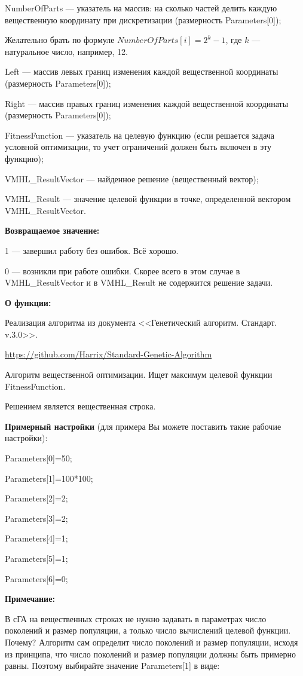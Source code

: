 \documentclass[a4paper,12pt]{article}
\begin{document}
 NumberOfParts --- указатель на массив: на сколько частей делить каждую вещественную координату при дискретизации (размерность Parameters[0]);
 
  Желательно брать по формуле $NumberOfParts[i]=2^k-1$, где $k$ --- натуральное число, например, 12.
  
 Left --- массив левых границ изменения каждой вещественной координаты (размерность Parameters[0]);
 
 Right --- массив правых границ изменения каждой вещественной координаты (размерность Parameters[0]);
 
 FitnessFunction --- указатель на целевую функцию (если решается задача условной оптимизации, то учет ограничений должен быть включен в эту функцию);
 
 VMHL\_ResultVector --- найденное решение (вещественный вектор);
 
 VMHL\_Result --- значение целевой функции в точке, определенной вектором VMHL\_ResultVector.

\textbf{Возвращаемое значение:} 

 1 --- завершил работу без ошибок. Всё хорошо.
 
 0 --- возникли при работе ошибки. Скорее всего в этом случае в VMHL\_ResultVector и в VMHL\_Result не содержится решение задачи.

\textbf{О функции:}

Реализация алгоритма из документа <<Генетический алгоритм. Стандарт. v.3.0>>.

\href{https://github.com/Harrix/Standard-Genetic-Algorithm}{https://github.com/Harrix/Standard-Genetic-Algorithm}

Алгоритм вещественной оптимизации. Ищет максимум целевой функции FitnessFunction.

Решением является вещественная строка.

\textbf{Примерный настройки} (для примера Вы можете поставить такие рабочие настройки):

 Parameters[0]=50;
 
Parameters[1]=100*100;

Parameters[2]=2;

Parameters[3]=2;

Parameters[4]=1;

Parameters[5]=1;

Parameters[6]=0;


\textbf{Примечание:}

 В сГА на вещественных строках не нужно задавать в параметрах число поколений и размер популяции, а только число вычислений целевой функции. Почему? Алгоритм сам определит число поколений и размер популяции, исходя из принципа, что число поколений и размер популяции должны быть примерно равны. Поэтому выбирайте значение Parameters[1] в виде:
\end{document}
